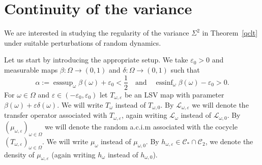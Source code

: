 \documentclass[12pt,reqno,a4paper]{article}
\DeclareMathOperator{\esssup}{esssup}
\DeclareMathOperator{\essinf}{essinf}
\begin{document}
	
	\section{Continuity of the variance}\label{sec:varcont}
	We are interested in studying the regularity of the variance $\Sigma^2$ in Theorem~\ref{qclt} under suitable perturbations of random dynamics.
	
	Let us start by introducing the appropriate setup. We take $\varepsilon_0>0$ and measurable maps $\beta \colon \Omega \to (0, 1)$ and $\delta \colon \Omega \to (0, 1)$ such that 
	\[
	\alpha:=\esssup_{\omega}\beta (\omega)+\varepsilon_0 <\frac 1 2 \quad \text{and} \quad \essinf_{\omega}\beta(\omega)-\varepsilon_0>0.
	\]
	For $\omega \in \Omega$ and $\varepsilon \in (-\varepsilon_0, \varepsilon_0)$ let $T_{\omega, \varepsilon}$ be an LSV map with parameter $\beta (\omega)+\varepsilon \delta (\omega)$. We will write $T_{\omega}$ instead of $T_{\omega, 0}$. By $\mathcal L_{\omega, \varepsilon}$ we will denote the transfer operator associated with $T_{\omega, \varepsilon}$, again writing $\mathcal L_\omega$ instead of $\mathcal L_{\omega, 0}$.
	By $(\mu_{\omega, \varepsilon})_{\omega \in \Omega}$ we will denote the random a.c.i.m associated with the cocycle $(T_{\omega, \varepsilon})_{\omega \in \Omega}$. We will write $\mu_\omega$ instead of $\mu_{\omega, 0}$. By $h_{\omega, \varepsilon}\in \mathcal C_*\cap \mathcal C_2$, we denote the density of $\mu_{\omega, \varepsilon}$ (again writing $h_\omega$ instead of $h_{\omega, 0}$). 
	
\end{document}
